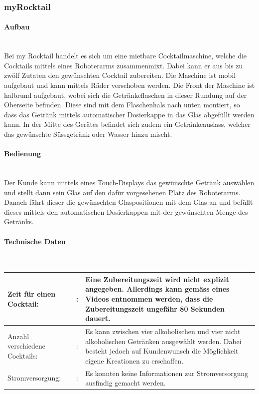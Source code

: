 \subsubsection{myRocktail}\label{subsubsec:myRocktail}

\paragraph{Aufbau}\label{subsubsec:Aufbau_myRocktail}\mbox{}\\

Bei my Rocktail handelt es sich um eine mietbare Cocktailmaschine, welche die Cocktails mittels eines Roboterarms zusammenmixt. Dabei kann er aus bis zu zwölf Zutaten den gewünschten Cocktail zubereiten. Die Maschine ist mobil aufgebaut und kann mittels Räder verschoben werden. Die Front der Maschine ist halbrund aufgebaut, wobei sich die Getränkeflaschen in dieser Rundung auf der Oberseite befinden. Diese sind mit dem Flaschenhals nach unten montiert, so dass das Getränk mittels automatischer Dosierkappe in das Glas abgefüllt werden kann. In der Mitte des Gerätes befindet sich zudem ein Getränkeauslass, welcher das gewünschte Süssgetränk oder Wasser hinzu mischt. \cite{myrocktail.de_home_nodate}

\newpage
\paragraph{Bedienung}\label{subsubsec:Bedienung_myRocktail}\mbox{}\\

Der Kunde kann mittels eines Touch-Displays das gewünschte Getränk auswählen und stellt dann sein Glas auf den dafür vorgesehenen Platz des Roboterarms. Danach fährt dieser die gewünschten Glaspositionen mit dem Glas an und befüllt dieses mittels den automatischen Dosierkappen mit der gewünschten Menge des Getränks. \cite{myrocktail.de_home_nodate} \cite{cnc_automation_wurfel_myrocktail_2017}


\paragraph{Technische Daten}\label{subsubsec:Technische_Daten_myRocktail}\mbox{}\\

\begin{tabular}{@{}llp{}}
    Zeit für einen Cocktail: & : & Eine Zubereitungszeit wird nicht explizit angegeben. Allerdings kann gemäss eines Videos entnommen werden, dass die Zubereitungszeit ungefähr 80 Sekunden dauert. \cite{cnc_automation_wurfel_myrocktail_2017} \\
    \hline
    Anzahl verschiedene Cocktails: & : & Es kann zwischen vier alkoholischen und vier nicht alkoholischen Getränken ausgewählt werden. Dabei besteht jedoch auf Kundenwunsch die Möglichkeit eigene Kreationen zu erschaffen. \\ 
    \hline
    Stromversorgung: & : & Es konnten keine Informationen zur Stromversorgung ausfindig gemacht werden. \\
\end{tabular}

